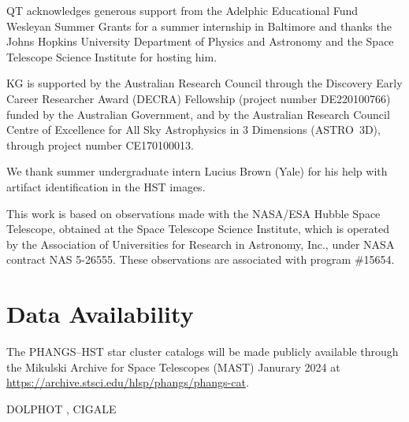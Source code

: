 \documentclass[linenumbers]{aastex63}
\begin{document}
QT acknowledges generous support from the Adelphic Educational Fund Wesleyan Summer Grants for a summer internship in Baltimore and thanks the Johns Hopkins University Department of Physics and Astronomy and the Space Telescope Science Institute for hosting him.

KG is supported by the Australian Research Council through the Discovery Early Career Researcher Award (DECRA) Fellowship (project number DE220100766) funded by the Australian Government, and by the Australian Research Council Centre of Excellence for All Sky Astrophysics in 3 Dimensions (ASTRO~3D), through project number CE170100013.

We thank summer undergraduate intern Lucius Brown (Yale) for his help with artifact identification in the HST images.

This work is based on observations made with the NASA/ESA Hubble Space Telescope, obtained at the Space Telescope Science Institute, which is operated by the Association of Universities for Research in Astronomy, Inc., under NASA contract NAS 5-26555. These observations are associated with program \#15654. 


\section*{Data Availability}
The PHANGS--HST star cluster catalogs will be made publicly available through the Mikulski Archive for Space Telescopes (MAST) Janurary 2024 at \url{https://archive.stsci.edu/hlsp/phangs/phangs-cat}.

{DOLPHOT \citep[v2.0][]{dolphin_dolphot_2016}, CIGALE \citep{burgarella_star_2005,noll_analysis_2009,boquien_cigale_2019}}

%
   
 

\clearpage


\appendix
\end{document}
